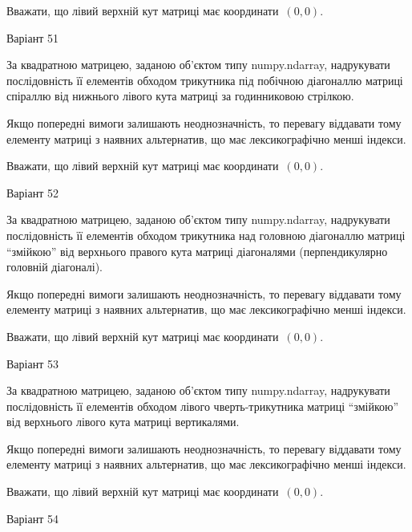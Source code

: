 \documentclass[11pt]{article}
\begin{document}
Вважати, що лівий верхній кут матриці має координати~$(0,0)$.



{\Large \center  Варіант  51\par \bigskip\bigskip}

За квадратною матрицею, заданою об'єктом типу numpy.ndarray, надрукувати послідовність її елементів обходом трикутника під побічною діагоналлю матриці спіраллю від нижнього лівого кута матриці за годинниковою стрілкою.

\vspace{2mm}
Якщо попередні вимоги залишають неоднозначність, то перевагу віддавати тому елементу матриці з наявних альтернатив, що має лексикографічно менші індекси.

Вважати, що лівий верхній кут матриці має координати~$(0,0)$.



{\Large \center  Варіант  52\par \bigskip\bigskip}

За квадратною матрицею, заданою об'єктом типу numpy.ndarray, надрукувати послідовність її елементів обходом трикутника над головною діагоналлю матриці ``змійкою'' від верхнього правого кута матриці діагоналями (перпендикулярно головній діагоналі).

\vspace{2mm}
Якщо попередні вимоги залишають неоднозначність, то перевагу віддавати тому елементу матриці з наявних альтернатив, що має лексикографічно менші індекси.

Вважати, що лівий верхній кут матриці має координати~$(0,0)$.



{\Large \center  Варіант  53\par \bigskip\bigskip}

За квадратною матрицею, заданою об'єктом типу numpy.ndarray, надрукувати послідовність її елементів обходом лівого чверть-трикутника матриці ``змійкою'' від верхнього лівого кута матриці вертикалями.

\vspace{2mm}
Якщо попередні вимоги залишають неоднозначність, то перевагу віддавати тому елементу матриці з наявних альтернатив, що має лексикографічно менші індекси.

Вважати, що лівий верхній кут матриці має координати~$(0,0)$.



{\Large \center  Варіант  54\par \bigskip\bigskip}
\end{document}
